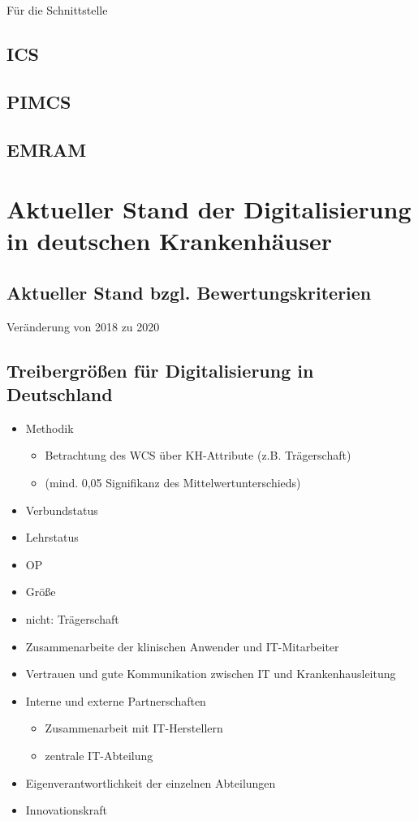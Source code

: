 		Für die Schnittstelle
	\subsection{ICS}
	\subsection{PIMCS}
	\subsection{EMRAM}
	\parencite{Stephani2019}
\section{Aktueller Stand der Digitalisierung in deutschen Krankenhäuser} \label{sec:stand in deutschland}
	\subsection{Aktueller Stand bzgl. Bewertungskriterien}
		Veränderung von 2018 zu 2020
	\subsection{Treibergrößen für Digitalisierung in Deutschland}
	\begin{itemize}
		\item Methodik
		\begin{itemize}
			\item Betrachtung des WCS über KH-Attribute (z.B. Trägerschaft)
			\item (mind. 0,05 Signifikanz des Mittelwertunterschieds)
		\end{itemize}
	\end{itemize}
	\begin{itemize}
		\item Verbundstatus \parencite{cresswell2013}
		\item Lehrstatus
		\item OP
		\item Größe \parencite{cresswell2013}
		\item nicht: Trägerschaft \parencite{cresswell2013}
	\end{itemize}
	\begin{itemize}
		\item Zusammenarbeite der klinischen Anwender und IT-Mitarbeiter
		\item Vertrauen und gute Kommunikation zwischen IT und Krankenhausleitung
		\item Interne und externe Partnerschaften
		\begin{itemize}
			\item Zusammenarbeit mit IT-Herstellern
			\item zentrale IT-Abteilung
		\end{itemize}
		\item Eigenverantwortlichkeit der einzelnen Abteilungen
		\item Innovationskraft
	\end{itemize}
